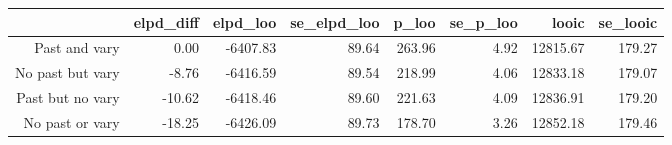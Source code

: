 \begin{table}[ht]
\centering
\begin{tabular}{rrrrrrrr}
  \hline
 & elpd\_diff & elpd\_loo & se\_elpd\_loo & p\_loo & se\_p\_loo & looic & se\_looic \\ 
  \hline
Past and vary & 0.00 & -6407.83 & 89.64 & 263.96 & 4.92 & 12815.67 & 179.27 \\ 
  No past but vary & -8.76 & -6416.59 & 89.54 & 218.99 & 4.06 & 12833.18 & 179.07 \\ 
  Past but no vary & -10.62 & -6418.46 & 89.60 & 221.63 & 4.09 & 12836.91 & 179.20 \\ 
  No past or vary & -18.25 & -6426.09 & 89.73 & 178.70 & 3.26 & 12852.18 & 179.46 \\ 
   \hline
\end{tabular}
\end{table}
